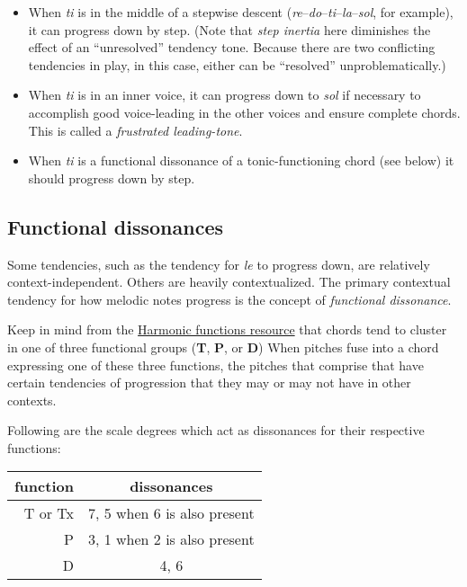 \documentclass{book}
\providecommand{\tightlist}{%
  \setlength{\itemsep}{0pt}\setlength{\parskip}{0pt}}
\begin{document}
\begin{itemize}
\tightlist
\item
  When \emph{ti} is in the middle of a stepwise descent
  (\emph{re}--\emph{do}--\emph{ti}--\emph{la}--\emph{sol}, for example), it
  can progress down by step. (Note that \emph{step inertia} here diminishes
  the effect of an ``unresolved'' tendency tone. Because there are two
  conflicting tendencies in play, in this case, either can be ``resolved''
  unproblematically.)\\
\item
  When \emph{ti} is in an inner voice, it can progress down to \emph{sol} if
  necessary to accomplish good voice-leading in the other voices and ensure
  complete chords. This is called a \emph{frustrated leading-tone}.\\
\item
  When \emph{ti} is a functional dissonance of a tonic-functioning chord (see
  below) it should progress down by step.
\end{itemize}

\hypertarget{functional-dissonances-1}{%
\subsection{Functional dissonances}\label{functional-dissonances-1}}

Some tendencies, such as the tendency for \emph{le} to progress down, are
relatively context-independent. Others are heavily contextualized. The primary
contextual tendency for how melodic notes progress is the concept of
\emph{functional dissonance}.

Keep in mind from the \href{harmonicFunctions.html}{Harmonic functions
resource} that chords tend to cluster in one of three functional groups
(\textbf{T}, \textbf{P}, or \textbf{D}) When pitches fuse into a chord
expressing one of these three functions, the pitches that comprise that have
certain tendencies of progression that they may or may not have in other
contexts.

Following are the scale degrees which act as dissonances for their respective
functions:

\begin{longtable}[]{@{}rc@{}}
\toprule
function & dissonances \\
\midrule
\endhead
T or Tx & 7, 5 when 6 is also present \\
P & 3, 1 when 2 is also present \\
D & 4, 6 \\
\bottomrule
\end{longtable}
\end{document}
